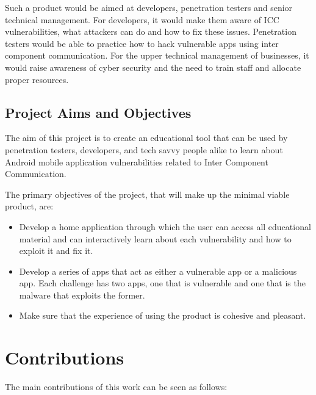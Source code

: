         Such a product would be aimed at developers, penetration testers and senior technical management. For developers, it would make them aware of ICC vulnerabilities, what attackers can do and how to fix these issues. Penetration testers would be able to practice how to hack vulnerable apps using inter component communication. For the upper technical management of businesses, it would raise awareness of cyber security and the need to train staff and allocate proper resources.
        
        \subsection{Project Aims and Objectives}
        
        The aim of this project is to create an educational tool that can be used by penetration testers, developers, and tech savvy people alike to learn about Android mobile application vulnerabilities related to Inter Component Communication.
        
        The primary objectives of the project, that will make up the minimal viable product, are:
        
        \begin{itemize}
            \item Develop a home application through which the user can access all educational material and can interactively learn about each vulnerability and how to exploit it and fix it.
            \item Develop a series of apps that act as either a vulnerable app or a malicious app. Each challenge has two apps, one that is vulnerable and one that is the malware that exploits the former.
            \item Make sure that the experience of using the product is cohesive and pleasant.
        \end{itemize}
	
	\section{Contributions} 
		\label{sec:intro_contribs} 
		
		The main contributions of this work can be seen as follows:
		
